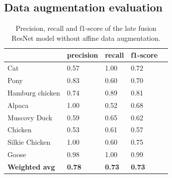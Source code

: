 \documentclass{l4proj}
\begin{document}
\begin{appendices}

\chapter{Data augmentation evaluation}
\label{appendix_augmentation}

\begin{table}[H]
  \centering
  \begin{tabular}{@{}lllll@{}}
  \toprule
                        & \textbf{precision} & \textbf{recall} & \textbf{f1-score} &  \\ \midrule
  Cat                   & 0.57               & 1.00            & 0.72              &  \\
  Pony                  & 0.83               & 0.60            & 0.70              &  \\
  Hamburg chicken       & 0.74               & 0.89            & 0.81              &  \\
  Alpaca                & 1.00               & 0.52            & 0.68              &  \\
  Muscovy Duck          & 0.59               & 0.65            & 0.62              &  \\
  Chicken               & 0.53               & 0.61            & 0.57              &  \\
  Silkie Chicken        & 1.00               & 0.60            & 0.75              &  \\
  Goose                 & 0.98               & 1.00            & 0.99              &  \\
  \midrule
  \textbf{Weighted avg} & \textbf{0.78}      & \textbf{0.73}   & \textbf{0.73}     &  \\ \bottomrule
  \end{tabular}
  \vspace*{3mm}
  \caption{Precision, recall and f1-score of the late fusion ResNet model without affine data augmentation.}
  \label{table:appendix_affine_1}
  \vspace*{-3mm}
\end{table}


\end{appendices}
\end{document}

